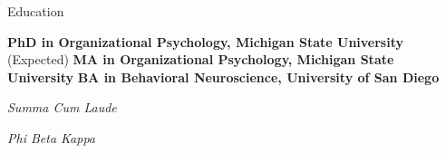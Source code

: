 \begin{rubric}{Education}

\entry*[2021]%
	\textbf{PhD in Organizational Psychology, Michigan State University} (Expected)
%
\entry*[2019]%
	\textbf{MA in Organizational Psychology, Michigan State University}
%
%
\entry*[2016]%
	\textbf{BA in Behavioral Neuroscience, University of San Diego}\par
	\emph{Summa Cum Laude}\par
	\emph{Phi Beta Kappa}
%
\end{rubric}


